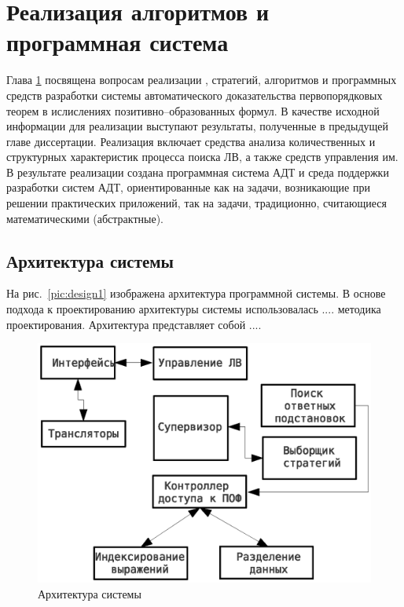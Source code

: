 \chapter{Реализация алгоритмов и программная система}\label{part:three}

Глава \ref{part:three} посвящена вопросам реализации , стратегий, алгоритмов и программных средств разработки системы автоматического доказательства первопорядковых теорем в ислислениях позитивно--образованных формул. В качестве исходной информации для реализации выступают результаты, полученные в предыдущей главе диссертации. Реализация включает средства анализа количественных и структурных характеристик процесса поиска ЛВ, а также средств управления им. В результате реализации создана программная система АДТ и среда поддержки разработки систем АДТ, ориентированные как на задачи, возникающие при решении практических приложений, так на задачи, традиционно, считающиеся математическими (абстрактные).

\section{Архитектура системы}
На рис.~\ref{pic:design1} изображена архитектура программной системы. В основе подхода к проектированию архитектуры системы использовалась .... методика проектирования. Архитектура представляет собой ....

\begin{figure}[h]
	\centering
	\includegraphics[width=0.7\linewidth]{pics/Design1.eps}
	\caption{Архитектура системы}
	\label{fig:design1}
\end{figure}

